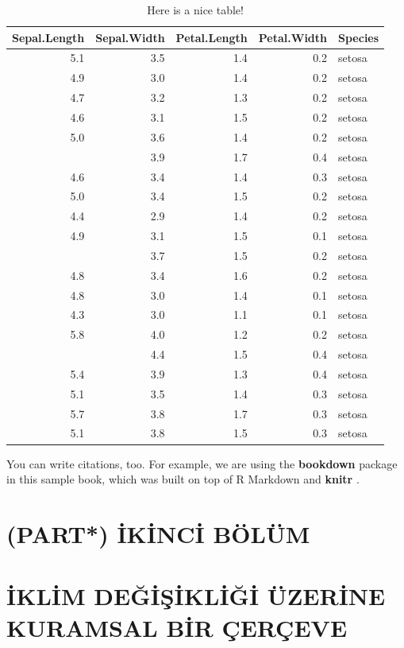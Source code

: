 \documentclass[
]{book}
\begin{document}
\begin{table}

\caption{\label{tab:nice-tab}Here is a nice table!}
\centering
\begin{tabular}[t]{rrrrl}
\toprule
Sepal.Length & Sepal.Width & Petal.Length & Petal.Width & Species\\
\midrule
5.1 & 3.5 & 1.4 & 0.2 & setosa\\
4.9 & 3.0 & 1.4 & 0.2 & setosa\\
4.7 & 3.2 & 1.3 & 0.2 & setosa\\
4.6 & 3.1 & 1.5 & 0.2 & setosa\\
5.0 & 3.6 & 1.4 & 0.2 & setosa\\
\addlinespace
5.4 & 3.9 & 1.7 & 0.4 & setosa\\
4.6 & 3.4 & 1.4 & 0.3 & setosa\\
5.0 & 3.4 & 1.5 & 0.2 & setosa\\
4.4 & 2.9 & 1.4 & 0.2 & setosa\\
4.9 & 3.1 & 1.5 & 0.1 & setosa\\
\addlinespace
5.4 & 3.7 & 1.5 & 0.2 & setosa\\
4.8 & 3.4 & 1.6 & 0.2 & setosa\\
4.8 & 3.0 & 1.4 & 0.1 & setosa\\
4.3 & 3.0 & 1.1 & 0.1 & setosa\\
5.8 & 4.0 & 1.2 & 0.2 & setosa\\
\addlinespace
5.7 & 4.4 & 1.5 & 0.4 & setosa\\
5.4 & 3.9 & 1.3 & 0.4 & setosa\\
5.1 & 3.5 & 1.4 & 0.3 & setosa\\
5.7 & 3.8 & 1.7 & 0.3 & setosa\\
5.1 & 3.8 & 1.5 & 0.3 & setosa\\
\bottomrule
\end{tabular}
\end{table}

You can write citations, too. For example, we are using the \textbf{bookdown} package \citep{R-bookdown} in this sample book, which was built on top of R Markdown and \textbf{knitr} \citep{xie2015}.

\hypertarget{part-ikinci-buxf6luxfcm}{%
\chapter{(PART*) İKİNCİ BÖLÜM}\label{part-ikinci-buxf6luxfcm}}

\hypertarget{iklim-deux11fiux15fikliux11fi-uxfczerine-kuramsal-bir-uxe7eruxe7eve}{%
\chapter{İKLİM DEĞİŞİKLİĞİ ÜZERİNE KURAMSAL BİR ÇERÇEVE}\label{iklim-deux11fiux15fikliux11fi-uxfczerine-kuramsal-bir-uxe7eruxe7eve}}
\end{document}
